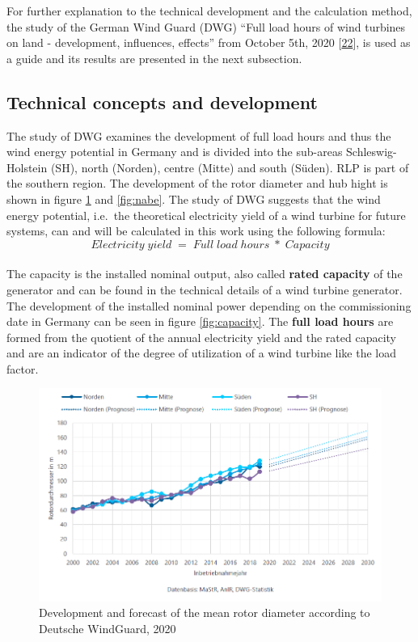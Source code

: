 \documentclass[a4paper,11pt]{article}
\begin{document}
For further explanation to the technical development and the calculation method, the study of the German Wind Guard (DWG) ``Full load hours of wind turbines on land - development, influences, effects'' from October 5th, 2020 {[}\protect\hyperlink{ref-RasmusBorrmannDr.KnudRehfeldtDr.DennisKruse.2020}{22}{]}, is used as a guide and its results are presented in the next subsection.

\hypertarget{technical-concepts-and-development}{%
\subsection{Technical concepts and development}\label{technical-concepts-and-development}}

The study of DWG examines the development of full load hours and thus the wind energy potential in Germany and is divided into the sub-areas Schleswig-Holstein (SH), north (Norden), centre (Mitte) and south (Süden). RLP is part of the southern region. The development of the rotor diameter and hub hight is shown in figure \ref{fig:rotor} and \ref{fig:nabe}. The study of DWG suggests that the wind energy potential, i.e.~the theoretical electricity yield of a wind turbine for future systems, can and will be calculated in this work using the following formula:
\[
Electricity\;yield\; =\; Full\;load\;hours\; *\; Capacity
\]\\
The capacity is the installed nominal output, also called \textbf{rated capacity} of the generator and can be found in the technical details of a wind turbine generator. The development of the installed nominal power depending on the commissioning date in Germany can be seen in figure \ref{fig:capacity}. The \textbf{full load hours} are formed from the quotient of the annual electricity yield and the rated capacity and are an indicator of the degree of utilization of a wind turbine like the load factor.
\begin{figure}

{\centering \includegraphics[width=1\linewidth]{figures/DWG/DWG_Rotordurchmesser} 

}

\caption{Development and forecast of the mean rotor diameter according to Deutsche WindGuard, 2020}\label{fig:rotor}
\end{figure}
\end{document}
